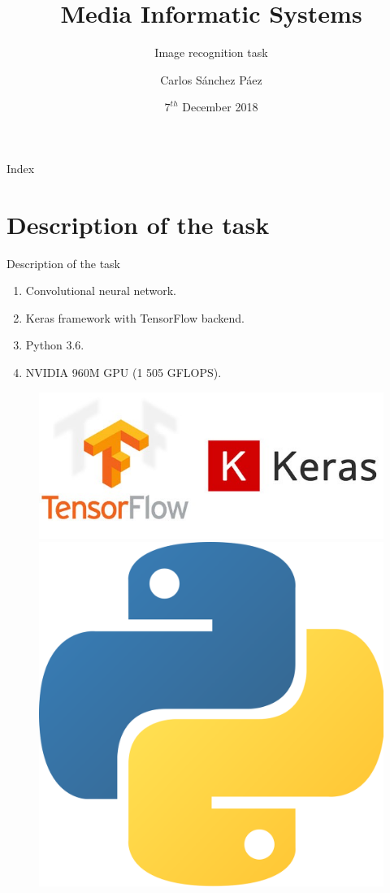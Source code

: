 \documentclass{beamer}
\title{Media Informatic Systems}
\date{$7^{th}$ December 2018}
\subtitle{Image recognition task}
\author{Carlos Sánchez Páez}
\begin{document}
\centering
\begin{frame}
 \titlepage
\end{frame}

\begin{frame}{Index}
 \tableofcontents
\end{frame}

\section{Description of the task}

\begin{frame}[fragile]{Description of the task}
 \vspace{1.8cm}
 \begin{enumerate}
  \item Convolutional neural network.
  \item Keras framework with TensorFlow backend.
  \item Python 3.6.
  \item NVIDIA 960M GPU (1 505 GFLOPS).
 \end{enumerate}
 \vspace{1.6cm}
 \begin{figure}[H]
  \includegraphics[scale=0.17]{img/keras.jpg}
  \hspace{0.8cm}
  \includegraphics[scale=0.03]{img/python.png}  \hspace{1cm}

\end{figure}
\end{frame}
\end{document}
